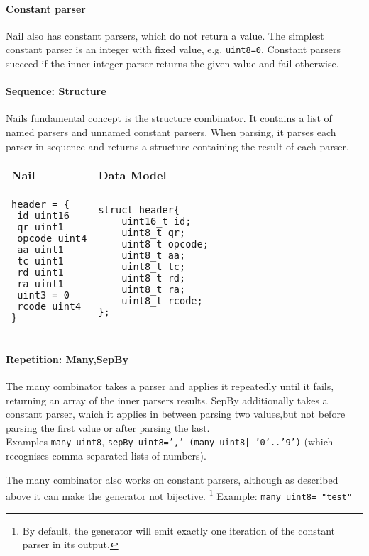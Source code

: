 \documentclass[10pt]{article}
\begin{document}
\paragraph{Constant parser}
Nail also has constant parsers, which do not return a value. The simplest constant parser is an
integer with fixed value, e.g. \texttt{uint8=0}. Constant parsers succeed if the inner integer
parser returns the given value and fail otherwise. 


\paragraph{Sequence: Structure}
Nails fundamental concept is the structure combinator. It contains a list of named parsers and
unnamed constant parsers. 
When parsing, it parses each parser in sequence and returns a structure containing the result of
each parser.

\begin{tabular}{ll}
\textbf{Nail} & \textbf{Data Model}\\
\begin{minipage}{2in}
\begin{verbatim}
header = {
 id uint16
 qr uint1
 opcode uint4
 aa uint1 
 tc uint1
 rd uint1
 ra uint1
 uint3 = 0
 rcode uint4
}
\end{verbatim} 
\end{minipage}
 & 
\begin{minipage}{2in}
\begin{verbatim}
struct header{
    uint16_t id;
    uint8_t qr;
    uint8_t opcode;
    uint8_t aa;
    uint8_t tc;
    uint8_t rd;
    uint8_t ra;
    uint8_t rcode;
};
\end{verbatim} 
\end{minipage} 
\\
\end{tabular}
\paragraph{Repetition: Many,SepBy}
The many combinator takes a parser and applies it repeatedly until it fails, returning an array of
the inner parsers results. SepBy additionally takes a constant parser, which it applies in between
parsing two values,but not before parsing the first value or after parsing the last.\\
Examples \texttt{many uint8}, \texttt{sepBy uint8=',' (many uint8| '0'..'9')} (which recognises
comma-separated lists of numbers).

The many combinator also works on constant parsers, although as described above it can make the
generator not bijective. \footnote{By default, the generator will emit exactly one iteration of the
  constant parser in its output.} Example: \texttt{many uint8= "test"}
\end{document}
